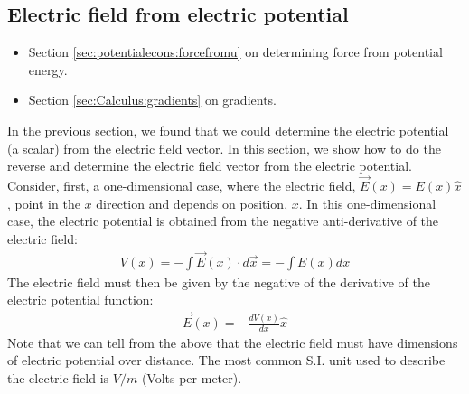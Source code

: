 \subsection{Electric field from electric potential}\label{sec:potential:fieldfrompotential}


\begin{review}
	\begin{itemize}
		\item Section \ref{sec:potentialecons:forcefromu} on determining force from potential energy.
		\item Section \ref{sec:Calculus:gradients} on gradients.
	\end{itemize}
\end{review}

In the previous section, we found that we could determine the electric potential (a scalar) from the electric field vector. In this section, we show how to do the reverse and determine the electric field vector from the electric potential. Consider, first, a one-dimensional case, where the electric field, $\vec E(x)= E(x) \hat x$, point in the $x$ direction and depends on position, $x$. In this one-dimensional case, the electric potential is obtained from the negative anti-derivative of the electric field:
\begin{align*}
V(x)=-\int \vec E(x)\cdot d\vec x=-\int E(x) dx
\end{align*}
The electric field must then be given by the negative of the derivative of the electric potential function:
\begin{align*}
\vec E(x) = -\frac{dV(x)}{dx}\hat x
\end{align*}
Note that we can tell from the above that the electric field must have dimensions of electric potential over distance. The most common S.I. unit used to describe the electric field is $\si{V/m}$ (Volts per meter). 

